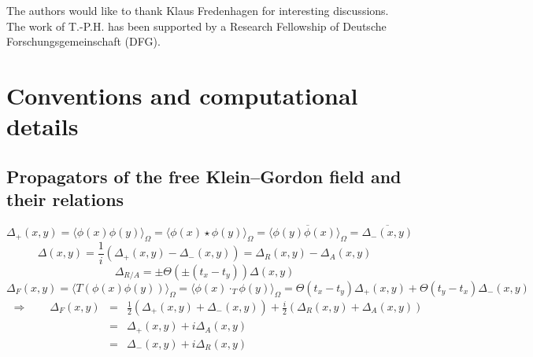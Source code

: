 \documentclass[a4paper,10pt,twoside]{article}
\let\maybesf\sffamily
\let\maybesf\rmfamily
\numberwithin{equation}{section}
\newcounter{and}
\newenvironment{acknowledgments}{
  \addvspace{1.5\baselineskip}
  \topsep=0pt\partopsep=0pt
  \trivlist\item[\hskip\labelsep\bfseries\maybesf Acknowledgments.]
}{}
\theoremstyle{plain}
\theoremstyle{definition}
\begin{document}

\begin{acknowledgments}
The authors would like to thank Klaus Fredenhagen for interesting discussions. The work of T.-P.H. has been supported by a Research Fellowship of Deutsche Forschungsgemeinschaft (DFG).
\end{acknowledgments}

\appendix

\section{Conventions and computational details}

\subsection{Propagators of the free Klein--Gordon field and their relations}
\label{sec_propagators}
$$\Delta_+(x,y)=\langle \phi(x)\phi(y)\rangle_\Omega = \langle \phi(x)\star\phi(y)\rangle_\Omega=\overline{\langle \phi(y)\phi(x)\rangle_\Omega}=\overline{\Delta_-(x,y)}$$
%
$$\Delta(x,y)=\frac{1}{i}\left(\Delta_+(x,y)-\Delta_-(x,y)\right)=\Delta_R(x,y)-\Delta_A(x,y)$$
%
$$\Delta_{R/A}=\pm\Theta(\pm(t_x-t_y))\Delta(x,y)$$
%
$$\Delta_F(x,y)=\langle T\left(\phi(x)\phi(y)\right)\rangle_\Omega = \langle \phi(x)\cdot_T\phi(y)\rangle_\Omega=\Theta(t_x-t_y)\Delta_+(x,y)+\Theta(t_y-t_x)\Delta_-(x,y)$$
%
\begin{eqnarray*}
\Rightarrow\qquad \Delta_F(x,y)&=&\frac{1}{2}\left(\Delta_+(x,y)+\Delta_-(x,y)\right)+\frac{i}{2}\left(\Delta_R(x,y)+\Delta_A(x,y)\right)\\
%
&=&\Delta_+(x,y)+i\Delta_A(x,y)\\
%
&=&\Delta_-(x,y)+i\Delta_R(x,y)
\end{eqnarray*}

\end{document}
